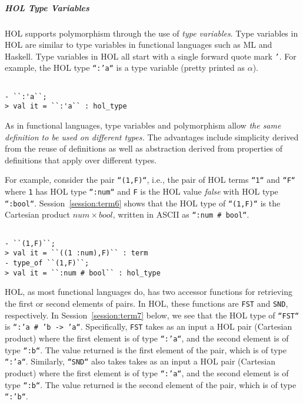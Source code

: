 \subparagraph*{HOL Type Variables}

HOL supports polymorphism through the use of \emph{type
  variables}. Type variables in HOL are similar to type variables in
functional languages such as ML and Haskell. Type variables in HOL all
start with a single forward quote mark \texttt{'}.  For example, the
HOL type \texttt{``:'a``} is a type variable (pretty printed as
$\alpha$).
\begin{session}
  \label{session:term5}
\begin{verbatim}

- ``:'a``;
> val it = ``:'a`` : hol_type
\end{verbatim}
\end{session}

As in functional languages, type variables and polymorphism allow
\emph{the same definition to be used on different types.}  The
advantages include simplicity derived from the reuse of definitions as
well as abstraction derived from properties of definitions that apply
over different types.  

For example, consider the pair \texttt{``(1,F)``}, i.e., the pair of
HOL terms \texttt{``1``} and \texttt{``F``} where \texttt{1} has HOL
type \texttt{``:num``} and \texttt{F} is the HOL value \emph{false}
with HOL type \texttt{``:bool``}. Session~\ref{session:term6} shows
that the HOL type of \texttt{``(1,F)``} is the Cartesian product $num
\times bool$, written in ASCII as \texttt{``:num \# bool``}.
\begin{session}
\label{session:term6}
\begin{verbatim}

- ``(1,F)``;
> val it = ``((1 :num),F)`` : term
- type_of ``(1,F)``;
> val it = ``:num # bool`` : hol_type
\end{verbatim}
\end{session}
HOL, as most functional languages do, has two accessor functions for
retrieving the first or second elements of pairs. In HOL, these
functions are \texttt{FST} and \texttt{SND}, respectively. In
Session~\ref{session:term7} below, we see that the HOL type of
\texttt{``FST``} is \texttt{``:'a \# 'b -> 'a``}. Specifically,
\texttt{FST} takes as an input a HOL pair (Cartesian product) where
the first element is of type \texttt{``:'a``}, and the second element
is of type \texttt{``:b``}. The value returned is the first element of
the pair, which is of type \texttt{``:'a``}.  Similarly,
\texttt{``SND``} also takes takes as an input a HOL pair (Cartesian
product) where the first element is of type \texttt{``:'a``}, and the
second element is of type \texttt{``:b``}. The value returned is the
second element of the pair, which is of type \texttt{``:'b``}.

